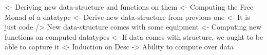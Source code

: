 \begin{wstructure}
<- Deriving new data-structure and functions on them
    <- Computing the Free Monad of a datatype
        <- Derive new data-structure from previous one
            <- It is just code
        /> New data-structure comes with some equipment
    <- Computing new functions on computed datatypes
        <- If data comes with structure, we ought to be able to capture it
            <- Induction on Desc
            -> Ability to compute over data
\end{wstructure}


